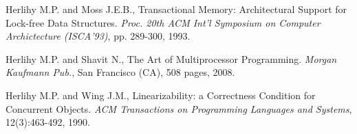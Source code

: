 \begin{thebibliography}{99}
{%


Herlihy M.P.  and Moss J.E.B., 
Transactional Memory: Architectural Support for Lock-free Data Structures. 
{\it Proc. 20th ACM Int'l Symposium  on Computer Archictecture (ISCA'93)}, 
pp. 289-300, 1993. 


% 
% 
% 
% 




Herlihy M.P.  and Shavit N.,
The Art of Multiprocessor Programming. 
{\it Morgan Kaufmann Pub.}, San Francisco (CA), 508 pages, 2008. 




Herlihy M.P.  and Wing J.M.,
Linearizability: a Correctness Condition for Concurrent Objects. 
{\it ACM Transactions on Programming Languages and Systems}, 
12(3):463-492, 1990. 

}
\end{thebibliography}
